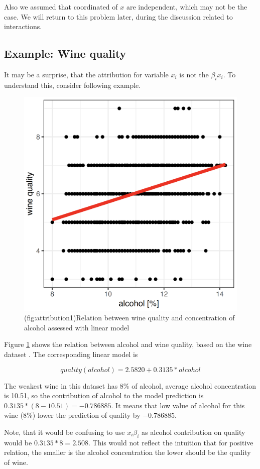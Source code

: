 \documentclass[]{krantz}
\theoremstyle{definition}
\theoremstyle{definition}
\theoremstyle{definition}
\theoremstyle{remark}
\begin{document}
Also we assumed that coordinated of \(x\) are independent, which may not
be the case. We will return to this problem later, during the discussion
related to interactions.

\hypertarget{example-wine-quality}{%
\subsection{Example: Wine quality}\label{example-wine-quality}}

It may be a surprise, that the attribution for variable \(x_i\) is not
the \(\beta_i x_i\). To understand this, consider following example.

\begin{figure}

{\centering \includegraphics[width=0.5\linewidth]{figure/attribution_1} 

}

\caption{(fig:attribution1)Relation between wine quality and concentration of alcohol assessed with linear model}\label{fig:attribution1}
\end{figure}

Figure \ref{fig:attribution1} shows the relation between alcohol and
wine quality, based on the wine dataset \citep{wine2009}. The
corresponding linear model is

\[
quality(alcohol) = 2.5820 + 0.3135 * alcohol
\]

The weakest wine in this dataset has 8\% of alcohol, average alcohol
concentration is 10.51, so the contribution of alcohol to the model
prediction is \(0.3135 *(8-10.51) = -0.786885\). It means that low value
of alcohol for this wine (8\%) lower the prediction of quality by
\(-0.786885\).

Note, that it would be confusing to use \(x_i\beta_i\) as alcohol
contribution on quality would be \(0.3135*8 = 2.508\). This would not
reflect the intuition that for positive relation, the smaller is the
alcohol concentration the lower should be the quality of wine.
\end{document}
